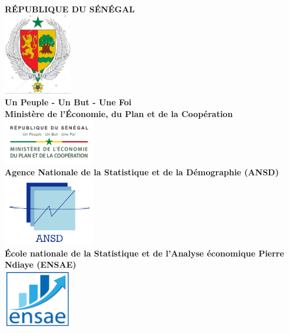 \documentclass[
]{article}
\author{}
\date{\vspace{-2.5em}}
\begin{document}
\begin{titlepage}
    \begin{center}
        \textbf{\LARGE RÉPUBLIQUE DU SÉNÉGAL}\\[0.1cm]
        \includegraphics[width=3cm]{Logo1.jpg} \\[0.1cm]  %
        \textbf{\large Un Peuple - Un But - Une Foi}\\[0.2cm]
        
        \textbf{\LARGE Ministère de l'Économie, du Plan et de la Coopération}\\[0.1cm]
        \includegraphics[width=4cm]{Logo2.png} \\[0.1cm] 
        
        \textbf{\large Agence Nationale de la Statistique et de la Démographie (ANSD)}\\[0.2cm]
        
        \includegraphics[width=4cm]{Logo3.png} \\[0.1cm]  
        
        \textbf{\large École nationale de la Statistique et de l'Analyse économique Pierre Ndiaye (ENSAE)}\\[0.4cm]
        \includegraphics[width=3cm]{Logo4.png} \\[0.1cm]
        

\end{center}
\end{titlepage}
\end{document}
